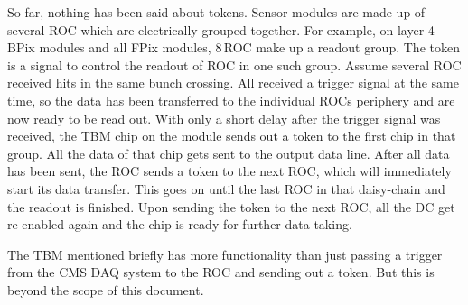 So far, nothing has been said about tokens. Sensor modules are made up of several \gls{ROC} which are electrically grouped together. For example, on layer 4 BPix modules and all FPix modules, 8\,\gls{ROC} make up a readout group. The token is a signal to control the readout of \gls{ROC} in one such group. Assume several \gls{ROC} received hits in the same bunch crossing. All received a trigger signal at the same time, so the data has been transferred to the individual ROCs periphery and are now ready to be read out. With only a short delay after the trigger signal was received, the \gls{TBM} chip on the module sends out a token to the first chip in that group. All the data of that chip gets sent to the output data line. After all data has been sent, the \gls{ROC} sends a token to the next \gls{ROC}, which will immediately start its data transfer. This goes on until the last \gls{ROC} in that daisy-chain and the readout is finished. Upon sending the token to the next \gls{ROC}, all the \gls{DC} get re-enabled again and the chip is ready for further data taking.

The \gls{TBM} mentioned briefly has more functionality than just passing a trigger from the CMS DAQ system to the \gls{ROC} and sending out a token. But this is beyond the scope of this document.


